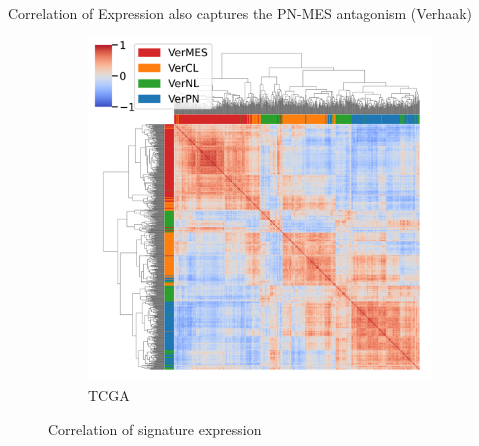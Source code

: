 \documentclass[aspectratio=169,9pt]{beamer}
\begin{document}
\begin{frame}{Correlation of Expression also captures the PN-MES antagonism (Verhaak)}
\begin{adjustwidth}{-5cm}{-5cm}
\begin{figure}
\begin{subfigure}[c]{0.48\textwidth}
                    \includegraphics[width=\textwidth]{TCGA_Corrplot_Ver}
                    \caption{TCGA}
                \end{subfigure}
                \caption{Correlation of signature expression}
            \end{figure}
        \end{adjustwidth}
    \end{frame}
\end{document}
